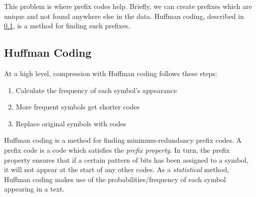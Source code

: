 This problem is where prefix codes help. Briefly, we can create prefixes which
are unique and not found anywhere else in the data. Huffman coding, described in
\cref{sec:huffman-coding}, is a method for finding such prefixes.

\subsection{Huffman Coding}
\label{sec:huffman-coding}
At a high level, compression with Huffman coding follows these steps:
\begin{enumerate}
\item Calculate the frequency of each symbol's appearance
\item More frequent symbols get shorter codes
\item Replace original symbols with codes
\end{enumerate}
Huffman coding is a method for finding minimum-redundancy prefix codes. A prefix
code is a code which satisfies the \emph{prefix property}. In turn, the prefix
property ensures that if a certain pattern of bits has been assigned to a
symbol, it will not appear at the start of any other
codes\cite[51]{salomon_data_2004}. As a \emph{statistical} method, Huffman
coding makes use of the probabilities/frequency of each symbol appearing in a
text.

